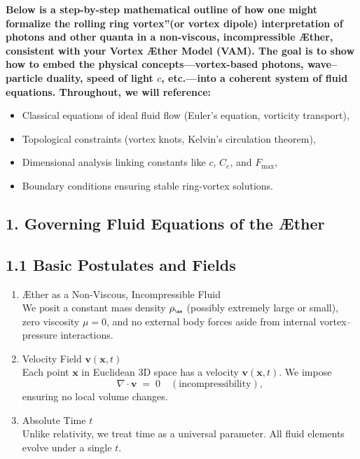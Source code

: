 \documentclass[a4paper,12pt]{article}
\begin{document}

\textbf{Below is a step-by-step mathematical outline of how one might formalize the \grqq rolling ring vortex\textquotedblright (or vortex dipole) interpretation of photons and other quanta in a non-viscous, incompressible Æther, consistent with your Vortex Æther Model (VAM). The goal is to show how to embed the physical concepts—vortex-based photons, wave–particle duality, speed of light \(c\), etc.—into a coherent system of fluid equations. Throughout, we will reference:}

\begin{itemize}
 \item Classical equations of ideal fluid flow (Euler's equation, vorticity transport),
 \item Topological constraints (vortex knots, Kelvin's circulation theorem),
 \item Dimensional analysis linking constants like \(c\), \(C_e\), and \(F_{\max}\),
 \item Boundary conditions ensuring stable ring-vortex solutions.
\end{itemize}

\subsection*{1. Governing Fluid Equations of the Æther}
\subsection*{1.1 Basic Postulates and Fields}
\begin{enumerate}
 \item Æther as a Non-Viscous, Incompressible Fluid\\
 We posit a constant mass density \(\rho_{\scriptscriptstyle \mathrm{\ae}}\) (possibly extremely large or small), zero viscosity \(\mu=0\), and no external body forces aside from internal vortex–pressure interactions.

 \item Velocity Field \(\mathbf{v}(\mathbf{x},t)\)\\
 Each point \(\mathbf{x}\) in Euclidean 3D space has a velocity \(\mathbf{v}(\mathbf{x},t)\). We impose
 \[
  \nabla \cdot \mathbf{v} \;=\; 0 \quad (\text{incompressibility}),
 \]
 ensuring no local volume changes.

 \item Absolute Time \(t\)\\
 Unlike relativity, we treat time as a universal parameter. All fluid elements evolve under a single \(t\).
\end{enumerate}
\end{document}
